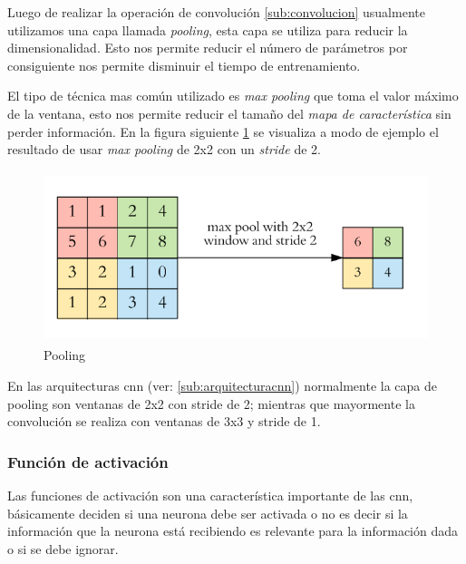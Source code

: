Luego de realizar la operación de convolución \ref{sub:convolucion} usualmente utilizamos una capa llamada \textit{pooling}, esta capa se utiliza para reducir la dimensionalidad. Esto nos permite reducir el número de parámetros por consiguiente nos permite disminuir el tiempo de entrenamiento.

El tipo de técnica mas común utilizado es \textit{max pooling} que toma el valor máximo de la ventana, esto nos permite reducir el tamaño del \textit{mapa de característica} sin perder información. En la figura siguiente \ref{Fig:Pooling} se visualiza a modo de ejemplo el resultado de usar \textit{max pooling} de 2x2 con un \textit{stride} de 2.

\begin{figure}[H]
 \centering
  \includegraphics[height=5cm,keepaspectratio=true,clip=true]{imagenes/MarcoTeorico/pooling_1.png}
  \caption{Pooling} \label{Fig:Pooling}
\end{figure}

En las arquitecturas \ac{cnn} (ver: \ref{sub:arquitecturacnn}) normalmente la capa de pooling son ventanas de 2x2 con stride de 2; mientras que mayormente la convolución se realiza con ventanas de 3x3 y stride de 1. 

\subsubsection{Función de activación}\label{sub:relu}
Las funciones de activación son una característica  importante de las \ac{cnn}, básicamente deciden si una neurona debe ser activada o no es decir si la información que la neurona está recibiendo es relevante para la información dada o si se debe ignorar.

